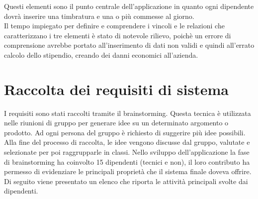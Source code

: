 \documentclass[12pt]{report}
\begin{document}
Questi elementi sono il punto centrale dell'applicazione in quanto ogni dipendente dovrà inserire una timbratura e una o più commesse al giorno.\\Il tempo impiegato per definire e comprendere i vincoli e le relazioni che caratterizzano i tre elementi è stato di notevole rilievo, poichè un errore di comprensione avrebbe portato all'inserimento di dati non validi e quindi all'errato calcolo dello stipendio, creando dei danni economici all'azienda.
\section{Raccolta dei requisiti di sistema}
I requisiti sono stati raccolti tramite il brainstorming. Questa tecnica è utilizzata nelle riunioni di gruppo per generare idee su un determinato argomento o prodotto. Ad ogni persona del gruppo è richiesto di suggerire più idee possibili. %
Alla fine del processo di raccolta, le idee vengono discusse dal gruppo, valutate e selezionate per poi raggrupparle in classi. Nello sviluppo dell'applicazione la fase di brainstorming ha coinvolto 15 dipendenti (tecnici e non), il loro contributo ha permesso di evidenziare le principali proprietà che il sistema finale doveva offrire. Di seguito viene presentato un elenco che riporta le attività principali svolte dai dipendenti.
\end{document}
